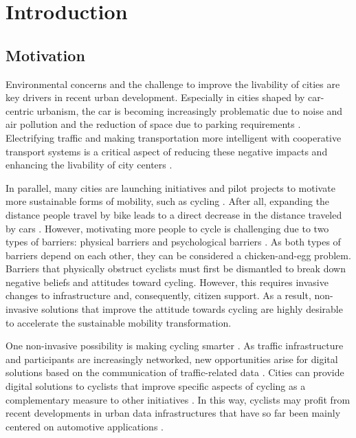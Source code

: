 \chapter{Introduction}

\section{Motivation}

Environmental concerns and the challenge to improve the livability of cities are key drivers in recent urban development. Especially in cities shaped by car-centric urbanism, the car is becoming increasingly problematic due to noise and air pollution and the reduction of space due to parking requirements \cite{gossling_why_2020}. Electrifying traffic and making transportation more intelligent with cooperative transport systems is a critical aspect of reducing these negative impacts and enhancing the livability of city centers \cite{seredynski_pathways_2023}. 

In parallel, many cities are launching initiatives and pilot projects to motivate more sustainable forms of mobility, such as cycling \cite{nieuwenhuijsen_car_2016, yang_tourists_2021}. After all, expanding the distance people travel by bike leads to a direct decrease in the distance traveled by cars \cite{hatfield_effect_2016}. However, motivating more people to cycle is challenging due to two types of barriers: physical barriers and psychological barriers \cite{nieuwenhuijsen_implementing_2019}. As both types of barriers depend on each other, they can be considered a chicken-and-egg problem. Barriers that physically obstruct cyclists must first be dismantled to break down negative beliefs and attitudes toward cycling. However, this requires invasive changes to infrastructure and, consequently, citizen support. As a result, non-invasive solutions that improve the attitude towards cycling are highly desirable to accelerate the sustainable mobility transformation. 

One non-invasive possibility is making cycling smarter \cite{nikolaeva_smart_2019}. As traffic infrastructure and participants are increasingly networked, new opportunities arise for digital solutions based on the communication of traffic-related data \cite{tran_factors_2023}. Cities can provide digital solutions to cyclists that improve specific aspects of cycling as a complementary measure to other initiatives \cite{oliveira_survey_2021}. In this way, cyclists may profit from recent developments in urban data infrastructures that have so far been mainly centered on automotive applications \cite{behrendt_cycling_2019}. 

